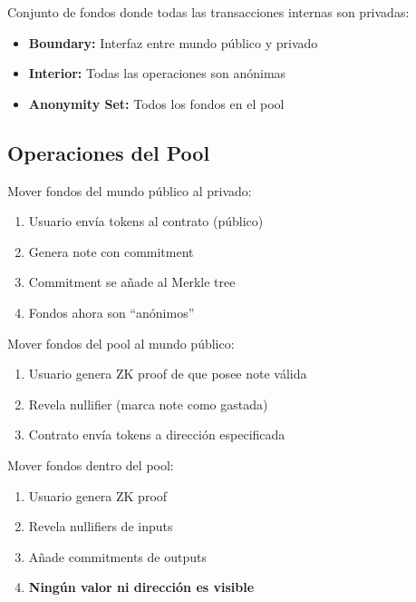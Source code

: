 \documentclass[11pt,a4paper,twoside]{book}
\begin{document}
\begin{definition}
Conjunto de fondos donde todas las transacciones internas son privadas:
\begin{itemize}
    \item \textbf{Boundary:} Interfaz entre mundo p\'ublico y privado
    \item \textbf{Interior:} Todas las operaciones son an\'onimas
    \item \textbf{Anonymity Set:} Todos los fondos en el pool
\end{itemize}
\end{definition}

\subsection{Operaciones del Pool}

\begin{definition}
Mover fondos del mundo p\'ublico al privado:
\begin{enumerate}
    \item Usuario env\'ia tokens al contrato (p\'ublico)
    \item Genera note con commitment
    \item Commitment se a\~nade al Merkle tree
    \item Fondos ahora son ``an\'onimos''
\end{enumerate}
\end{definition}

\begin{definition}
Mover fondos del pool al mundo p\'ublico:
\begin{enumerate}
    \item Usuario genera ZK proof de que posee note v\'alida
    \item Revela nullifier (marca note como gastada)
    \item Contrato env\'ia tokens a direcci\'on especificada
\end{enumerate}
\end{definition}

\begin{definition}
Mover fondos dentro del pool:
\begin{enumerate}
    \item Usuario genera ZK proof
    \item Revela nullifiers de inputs
    \item A\~nade commitments de outputs
    \item \textbf{Ning\'un valor ni direcci\'on es visible}
\end{enumerate}
\end{definition}
\end{document}
